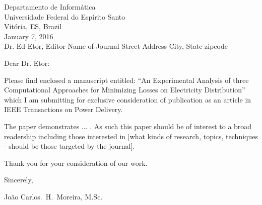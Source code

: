 \documentclass{letter}
\begin{document}
Departamento de Inform\'atica\\
Universidade Federal do Esp\'irito Santo\\
Vit\'oria, ES, Brazil\\
January 7, 2016\\

Dr. Ed Etor, Editor
Name of Journal
Street Address
City, State zipcode

Dear Dr. Etor:

Please find enclosed a manuscript entitled:
``An Experimental Analysis of three Computational Approaches for Minimizing Losses on Electricity Distribution''
 which I am submitting for exclusive consideration of publication as an article in IEEE Transactions on Power Delivery.

The paper demonstrates ... .
As such this paper should be of interest to a broad readership including those
interested in [what kinds of research, topics, techniques - should be those targeted by the journal].

Thank you for your consideration of our work.

Sincerely,

Jo\~ao Carlos.~H.~Moreira, M.Sc.
\end{document}
